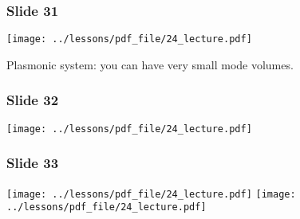 \documentclass[../main/main.tex]{subfiles}
\begin{document}
\subsubsection*{Slide 31}

\begin{minipage}[]{0.5\linewidth}
\centering
\texttt{[image: ../lessons/pdf\_file/24\_lecture.pdf]}
\end{minipage}
\hspace{0.3cm}\vspace{0.3cm}
\begin{minipage}[c]{0.47\linewidth}

Plasmonic system: you can have very small mode volumes.

\end{minipage}

\subsubsection*{Slide 32}

\begin{minipage}[]{0.5\linewidth}
\centering
\texttt{[image: ../lessons/pdf\_file/24\_lecture.pdf]}
\end{minipage}
\hspace{0.3cm}\vspace{0.3cm}
\begin{minipage}[c]{0.47\linewidth}

\end{minipage}

\subsubsection*{Slide 33}

\begin{minipage}[]{0.5\linewidth}
\centering
\texttt{[image: ../lessons/pdf\_file/24\_lecture.pdf]}
\texttt{[image: ../lessons/pdf\_file/24\_lecture.pdf]}
\end{minipage}
\hspace{0.3cm}\vspace{0.3cm}
\begin{minipage}[c]{0.47\linewidth}

\end{minipage}
\end{document}
